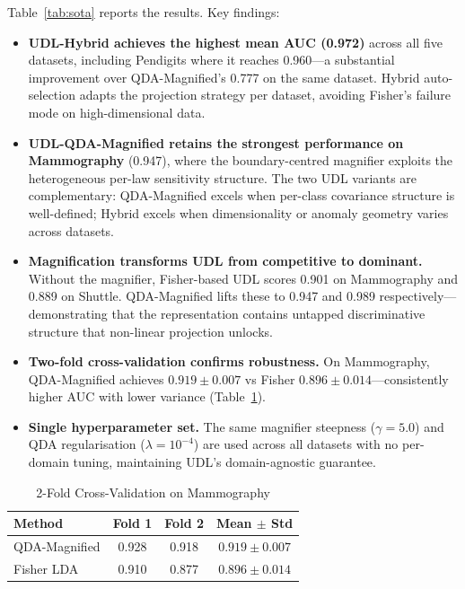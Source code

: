 \documentclass[journal]{IEEEtran}
\begin{document}
Table~\ref{tab:sota} reports the results. Key findings:

\begin{itemize}
  \item \textbf{UDL-Hybrid achieves the highest mean AUC (0.972)} across all five datasets, including Pendigits where it reaches 0.960---a substantial improvement over QDA-Magnified's 0.777 on the same dataset. Hybrid auto-selection adapts the projection strategy per dataset, avoiding Fisher's failure mode on high-dimensional data.
  \item \textbf{UDL-QDA-Magnified retains the strongest performance on Mammography} (0.947), where the boundary-centred magnifier exploits the heterogeneous per-law sensitivity structure. The two UDL variants are complementary: QDA-Magnified excels when per-class covariance structure is well-defined; Hybrid excels when dimensionality or anomaly geometry varies across datasets.
  \item \textbf{Magnification transforms UDL from competitive to dominant.} Without the magnifier, Fisher-based UDL scores 0.901 on Mammography and 0.889 on Shuttle. QDA-Magnified lifts these to 0.947 and 0.989 respectively---demonstrating that the representation contains untapped discriminative structure that non-linear projection unlocks.
  \item \textbf{Two-fold cross-validation confirms robustness.} On Mammography, QDA-Magnified achieves $0.919 \pm 0.007$ vs Fisher $0.896 \pm 0.014$---consistently higher AUC with lower variance (Table~\ref{tab:cv}).
  \item \textbf{Single hyperparameter set.} The same magnifier steepness ($\gamma{=}5.0$) and QDA regularisation ($\lambda{=}10^{-4}$) are used across all datasets with no per-domain tuning, maintaining UDL's domain-agnostic guarantee.
\end{itemize}

\begin{table}[h]
\centering
\caption{2-Fold Cross-Validation on Mammography}
\label{tab:cv}
\begin{tabular}{@{}lccc@{}}
\toprule
\textbf{Method} & \textbf{Fold 1} & \textbf{Fold 2} & \textbf{Mean $\pm$ Std} \\
\midrule
QDA-Magnified & 0.928 & 0.918 & $\mathbf{0.919 \pm 0.007}$ \\
Fisher LDA & 0.910 & 0.877 & $0.896 \pm 0.014$ \\
\bottomrule
\end{tabular}
\end{table}
\end{document}
